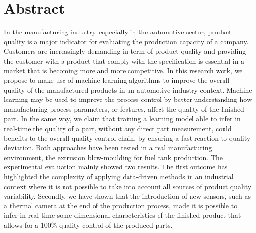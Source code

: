 \chapter*{Abstract}

In the manufacturing industry, especially in the automotive sector, product quality is a major indicator for evaluating the production capacity of a company. Customers are increasingly demanding in term of product quality and providing the customer with a product that comply with the specification is essential in a market that is becoming more and more competitive. In this research work, we propose to make use of machine learning algorithms to improve the overall quality of the manufactured products in an automotive industry context. Machine learning may be used to improve the process control by better understanding how manufacturing process parameters, or features,  affect the quality of the finished part. In the same way, we claim that training a learning model able to infer in real-time the quality of a part, without any direct part measurement, could benefits to the overall quality control chain, by ensuring a fast reaction to quality deviation. Both approaches have been tested in a real manufacturing environment, the extrusion blow-moulding for fuel tank production. The experimental evaluation mainly showed two results. The first outcome has highlighted the complexity of applying data-driven methods in an industrial context where it is not possible to take into account all sources of product quality variability. Secondly, we have shown that the introduction of new sensors, such as a thermal camera at the end of the production process, made it is possible to infer in real-time some dimensional characteristics of the finished product that allows for a 100\% quality control of the produced parts.   